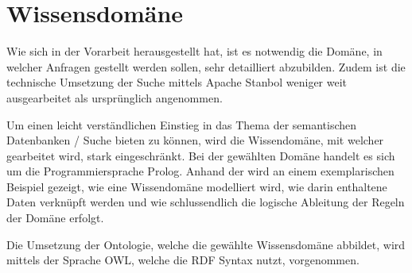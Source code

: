 \chapter{Wissensdomäne}
\label{chap:wissensdomäne}
Wie sich in der Vorarbeit herausgestellt hat, ist es notwendig die Domäne, in welcher Anfragen gestellt werden sollen, sehr detailliert abzubilden. Zudem ist die technische Umsetzung der Suche mittels Apache Stanbol weniger weit ausgearbeitet als ursprünglich angenommen.

Um einen leicht verständlichen Einstieg in das Thema der semantischen Datenbanken / Suche bieten zu können, wird die Wissendomäne, mit welcher gearbeitet wird, stark eingeschränkt. Bei der gewählten Domäne handelt es sich um die Programmiersprache Prolog. Anhand der wird an einem exemplarischen Beispiel gezeigt, wie eine Wissendomäne modelliert wird, wie darin enthaltene Daten verknüpft werden und wie schlussendlich die logische Ableitung der Regeln der Domäne erfolgt.

Die Umsetzung der Ontologie, welche die gewählte Wissensdomäne abbildet, wird mittels der Sprache OWL, welche die RDF Syntax nutzt, vorgenommen.


